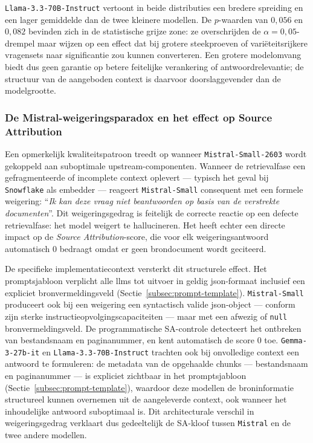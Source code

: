 \texttt{Llama-3.3-70B-Instruct} vertoont in beide distributies een bredere spreiding en een lager gemiddelde dan de twee kleinere modellen. De $p$-waarden van $0{,}056$ en $0{,}082$ bevinden zich in de statistische grijze zone: ze overschrijden de $\alpha = 0{,}05$-drempel maar wijzen op een effect dat bij grotere steekproeven of variëteitsrijkere vragensets naar significantie zou kunnen converteren. Een grotere modelomvang biedt dus geen garantie op betere feitelijke verankering of antwoordrelevantie; de structuur van de aangeboden context is daarvoor doorslaggevender dan de modelgrootte.

\subsubsection{De Mistral-weigeringsparadox en het effect op Source Attribution}
\label{subsec:mistral-paradox}

Een opmerkelijk kwaliteitspatroon treedt op wanneer \texttt{Mistral-Small-2603} wordt gekoppeld aan suboptimale upstream-componenten. Wanneer de retrievalfase een gefragmenteerde of incomplete context oplevert — typisch het geval bij \texttt{Snowflake} als embedder — reageert \texttt{Mistral-Small} consequent met een formele weigering: ``\textit{Ik kan deze vraag niet beantwoorden op basis van de verstrekte documenten}''. Dit weigeringsgedrag is feitelijk de correcte reactie op een defecte retrievalfase: het model weigert te hallucineren. Het heeft echter een directe impact op de \textit{Source Attribution}-score, die voor elk weigeringsantwoord automatisch $0$ bedraagt omdat er geen brondocument wordt geciteerd.

De specifieke implementatiecontext versterkt dit structurele effect. Het promptsjabloon verplicht alle \glspl{llm} tot uitvoer in geldig \gls{json}-formaat inclusief een expliciet bronvermeldingsveld (Sectie~\ref{subsec:prompt-template}). \texttt{Mistral-Small} produceert ook bij een weigering een syntactisch valide \gls{json}-object — conform zijn sterke instructieopvolgingscapaciteiten — maar met een afwezig of \texttt{null} bronvermeldingsveld. De programmatische SA-controle detecteert het ontbreken van bestandsnaam en paginanummer, en kent automatisch de score $0$ toe. \texttt{Gemma-3-27b-it} en \texttt{Llama-3.3-70B-Instruct} trachten ook bij onvolledige context een antwoord te formuleren: de metadata van de opgehaalde chunks — bestandsnaam en paginanummer — is expliciet zichtbaar in het promptsjabloon (Sectie~\ref{subsec:prompt-template}), waardoor deze modellen de broninformatie structureel kunnen overnemen uit de aangeleverde context, ook wanneer het inhoudelijke antwoord suboptimaal is. Dit architecturale verschil in weigeringsgedrag verklaart dus gedeeltelijk de SA-kloof tussen \texttt{Mistral} en de twee andere modellen.

